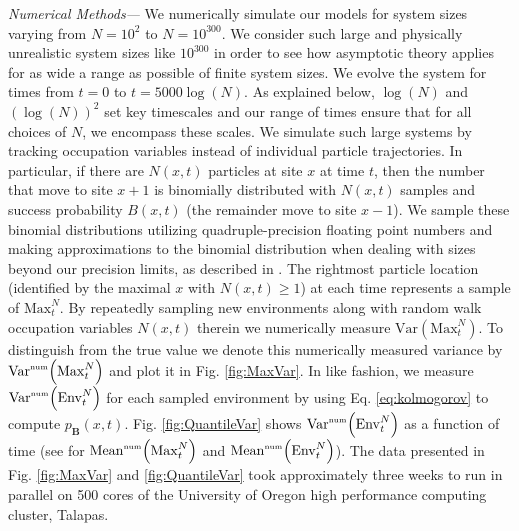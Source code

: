 \documentclass[%
 reprint,
 amsmath,amssymb,
 longbibliography,
 aps,
prl
]{revtex4-1}
\newcommand{\var}[1]{\mathrm{Var}\left(#1\right)}
\newcommand{\meannum}[1]{\mathrm{Mean}^{\textrm{\tiny{num}}}\!\left(#1\right)}
\newcommand{\varnum}[1]{\mathrm{Var}^{\textrm{\tiny{num}}}\!\left(#1\right)}
\def\maxnt{\mathrm{Max}^{N}_t}
\def\envnt{\mathrm{Env}^{N}_t}
\begin{document}
\medskip\noindent\emph{Numerical Methods---}
We numerically simulate our models for system sizes varying from $N=10^2$ to $N=10^{300}$. We consider such large and physically unrealistic system sizes like $10^{300}$ in order to see how asymptotic theory applies for as wide a  range as possible of finite system sizes. We evolve the system for times from $t=0$ to $t= 5000 \log(N)$.  As explained below, $\log(N)$ and $(\log(N))^2$ set key timescales and our range of times ensure that for all choices of $N$, we encompass these scales. We simulate such large systems by tracking occupation variables instead of individual particle trajectories. In particular, if there are $N(x,t)$ particles at site $x$ at time $t$, then the number that move to site $x+1$ is binomially distributed with $N(x,t)$ samples and success probability $B(x,t)$ (the remainder move to site $x-1$). We sample these binomial distributions utilizing quadruple-precision floating point numbers and making approximations to the binomial distribution when dealing with sizes beyond our precision limits, as described in \cite{SeeSupplementalMaterial}. The rightmost particle location (identified by the maximal $x$ with $N(x,t)\geq 1$) at each time represents a sample of $\maxnt$. By repeatedly sampling new environments along with random walk occupation variables $N(x,t)$ therein we numerically measure $\var{\maxnt}$. To distinguish from the true value we denote this numerically measured variance by $\varnum{\maxnt}$ and plot it in Fig. \ref{fig:MaxVar}. In like fashion, we measure $\varnum{\envnt}$ for each sampled environment by using Eq. \ref{eq:kolmogorov} to compute $p_{\mathbf{B}}(x,t)$.  Fig. \ref{fig:QuantileVar} shows $\varnum{\envnt}$ as a function of time (see \cite{SeeSupplementalMaterial} for $\meannum{\maxnt}$ and $\meannum{\envnt}$). The data presented in Fig. \ref{fig:MaxVar} and \ref{fig:QuantileVar} took approximately three weeks to run in parallel on 500 cores of the University of Oregon high performance computing cluster, Talapas.
\end{document}
